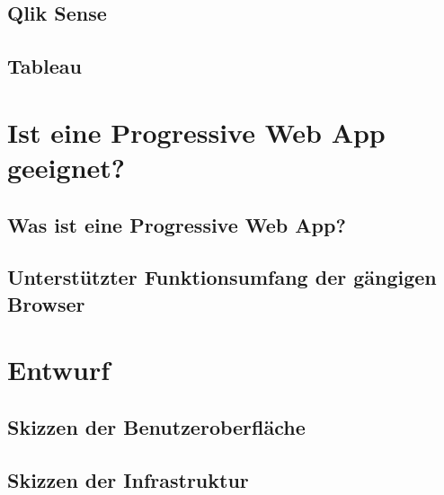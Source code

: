 \subsection{Qlik Sense}

\subsection{Tableau}

\section{Ist eine Progressive Web App geeignet?}

\subsection{Was ist eine Progressive Web App?}

\subsection{Unterstützter Funktionsumfang der gängigen Browser}

\section{Entwurf}

\subsection{Skizzen der Benutzeroberfläche}

\subsection{Skizzen der Infrastruktur}
